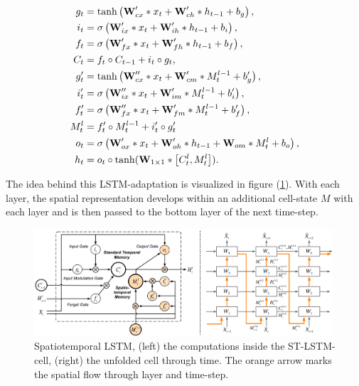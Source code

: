 \begin{align}\label{eq:stlstm}
    g_t&=\tanh\left(\textbf{W}'_{cx}*x_t + \textbf{W}'_{ch}* h_{t-1} + b_g\right),\notag\\
    i_t&=\sigma\left(\textbf{W}'_{ix}* x_t + \textbf{W}'_{ih}* h_{t-1} + b_i\right),\notag\\
    f_t&=\sigma\left(\textbf{W}'_{fx}* x_t + \textbf{W}'_{fh}* h_{t-1} + b_f\right),\notag \\
    C_t&=f_t\circ C_{t-1}+i_t\circ g_t,\notag\\
    g'_t&=\tanh\left(\textbf{W}''_{cx}*x_t + \textbf{W}'_{cm}* M^{l-1}_{t} + b'_g\right),\notag\\
    i'_t&=\sigma\left(\textbf{W}''_{ix}* x_t + \textbf{W}'_{im}* M^{l-1}_{t} + b'_i\right),\notag\\
    f'_t&=\sigma\left(\textbf{W}''_{fx}* x_t + \textbf{W}'_{fm}* M^{l-1}_{t} + b'_f\right),\notag\\
    M^{l}_t&=f'_t\circ M^{l-1}_t+i'_t\circ g'_t\notag\\
    o_t&=\sigma\left(\textbf{W}'_{ox}*x_t + \textbf{W}'_{oh}*h_{t-1} + \textbf{W}_{om}*M_t^l + b_o\right),\notag\\
    h_t&=o_t\circ\tanh(\textbf{W}_{1\times 1}*\left[C_t^l,M_t^l\right]).\notag\\
\end{align}

The idea behind this LSTM-adaptation is visualized in figure (\ref{fig:seq2seq}). With each layer, the spatial representation develops within an additional cell-state $M$ with each layer and is then passed to the bottom layer of the next time-step. 

\begin{figure}[ht]
    \center
    \includegraphics[width=0.99\textwidth]{figures/stlstm.png}
	\caption{Spatiotemporal LSTM, (left) the computations inside the ST-LSTM-cell, (right) the unfolded cell through time. The orange arrow marks the spatial flow through layer and time-step.}
	\label{fig:seq2seq}
\end{figure}

